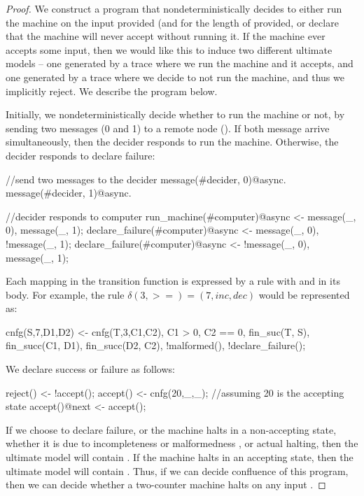 \begin{proof}
We construct a \lang program that nondeterministically decides to either run the machine on the input provided (and for the length of  provided, or declare that the machine will never accept without running it.  If the machine ever accepts some input, then we would like this to induce two different ultimate models -- one generated by a trace where we run the machine and it accepts, and one generated by a trace where we decide to not run the machine, and thus we implicitly reject.  We describe the program below.

Initially, we nondeterministically decide whether to run the machine or not, by sending two messages (0 and 1) to a remote node ().  If both message arrive simultaneously, then the decider responds to run the machine.  Otherwise, the decider responds to declare failure:

\begin{Dedalus}
//send two messages to the decider
message(#decider, 0)@async. 
message(#decider, 1)@async.

//decider responds to computer
run_machine(#computer)@async <- message(_, 0), message(_, 1);
declare_failure(#computer)@async <- message(_, 0), !message(_, 1);
declare_failure(#computer)@async <- !message(_, 0), message(_, 1);
\end{Dedalus}

Each mapping in the transition function is expressed by a \lang rule with  and  in its body.  For example, the rule $\delta(3, > =) = (7, inc, dec)$ would be represented as:

\begin{Dedalus}
cnfg(S,7,D1,D2) <- cnfg(T,3,C1,C2), C1 > 0, C2 == 0, fin_suc(T, S), fin_succ(C1, D1), fin_succ(D2, C2), !malformed(), !declare_failure();
\end{Dedalus}

We declare success or failure as follows:

\begin{Dedalus}
reject() <- !accept();
accept() <- cnfg(20,_,_); //assuming 20 is the accepting state
accept()@next <- accept();
\end{Dedalus}

If we choose to declare failure, or the machine halts in a non-accepting state, whether it is due to incompleteness or malformedness , or actual halting, then the ultimate model will contain .  If the machine halts in an accepting state, then the ultimate model will contain .  Thus, if we can decide confluence of this program, then we can decide whether a two-counter machine halts on any input .
\end{proof}

